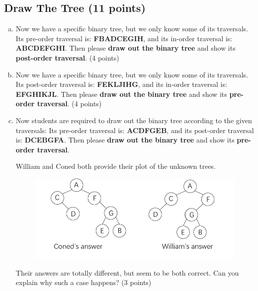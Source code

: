 \documentclass[11pt]{exam}
\begin{document}
\subsection{Draw The Tree (11 points)}
\begin{enumerate}[a)]
\item Now we have a specific binary tree, but we only know some of its traversals. Its pre-order traversal is: \textbf{FBADCEGIH}, and its in-order traversal is: \textbf{ABCDEFGHI}. Then please \textbf{draw out the binary tree} and show its \textbf{post-order traversal}. (4 points)

\begin{solution}
\end{solution}

\item Now we have a specific binary tree, but we only know some of its traversals. Its post-order traversal is: \textbf{FEKLJIHG}, and its in-order traversal is: \textbf{EFGHIKJL}. Then please \textbf{draw out the binary tree} and show its \textbf{pre-order traversal}. (4 points)

\begin{solution}
\end{solution}

\item Now students are required to draw out the binary tree according to the given traversals: Its pre-order traversal is: \textbf{ACDFGEB}, and its post-order traversal is: \textbf{DCEBGFA}. Then please \textbf{draw out the binary tree} and show its \textbf{pre-order traversal}.

William and Coned both provide their plot of the unknown trees. 
\begin{figure}[H]
\centering
\includegraphics[width=.8\linewidth]{Coned_vs_William.png}
\end{figure}

Their answers are totally different, but seem to be both correct. Can you explain why such a case happens? (3 points)

\begin{solution}
\end{solution}

\end{enumerate}
\end{document}
